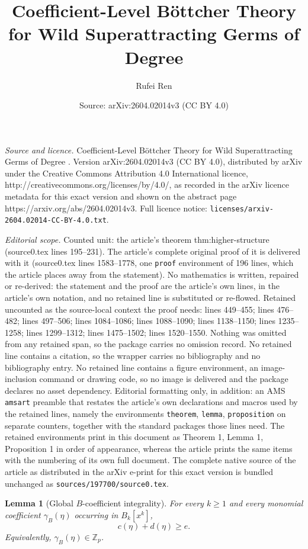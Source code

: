 \documentclass[10pt,a4paper]{amsart}
\title{Coefficient-Level B\"ottcher Theory for Wild Superattracting Germs of Degree \NoCaseChange{\texorpdfstring{$p^e$}{pe}}}
\author{Rufei Ren}
\date{Source: arXiv:2604.02014v3 (CC BY 4.0)}
\newtheorem{lemma}{Lemma}
\newcommand{\Zp}{\mathbb{Z}_p}
\begin{document}
\maketitle

\noindent\emph{Source and licence.} Coefficient-Level B\"ottcher Theory for Wild Superattracting Germs of Degree . Version arXiv:2604.02014v3 (CC BY 4.0), distributed by arXiv under the Creative Commons Attribution 4.0 International licence, http://creativecommons.org/licenses/by/4.0/, as recorded in the arXiv licence metadata for this exact version and shown on the abstract page https://arxiv.org/abs/2604.02014v3. Full licence notice: \texttt{licenses/arxiv-2604.02014-CC-BY-4.0.txt}.\par\smallskip

\noindent\textit{Editorial scope.} Counted unit: the article's theorem thm:higher-structure (source0.tex lines 195--231). The article's complete original proof of it is delivered with it (source0.tex lines 1583--1778, one \texttt{proof} environment of 196 lines, which the article places away from the statement). No mathematics is written, repaired or re-derived: the statement and the proof are the article's own lines, in the article's own notation, and no retained line is substituted or re-flowed.  Retained uncounted as the source-local context the proof needs: lines 449--455; lines 476--482; lines 497--506; lines 1084--1086; lines 1088--1090; lines 1138--1150; lines 1235--1258; lines 1299--1312; lines 1475--1502; lines 1520--1550.  Nothing was omitted from any retained span, so the package carries no omission record.  No retained line contains a citation, so the wrapper carries no bibliography and no bibliography entry.  No retained line contains a figure environment, an image-inclusion command or drawing code, so no image is delivered and the package declares no asset dependency.  Editorial formatting only, in addition: an AMS \texttt{amsart} preamble that restates the article's own declarations and macros used by the retained lines, namely the environments \texttt{theorem}, \texttt{lemma}, \texttt{proposition} on separate counters, together with the standard packages those lines need.  The retained environments print in this document as Theorem 1, Lemma 1, Proposition 1 in order of appearance, whereas the article prints the same items with the numbering of its own full document.  The complete native source of the article as distributed in the arXiv e-print for this exact version is bundled unchanged as \texttt{sources/197700/source0.tex}.
\begin{lemma}[Global $B$-coefficient integrality]\label{lem:B-integrality}
For every $k\ge1$ and every monomial coefficient $\gamma_B(\eta)$ occurring in $B_k[x^k]$,
\[
        c(\eta)+d(\eta)\ge e.
\]
Equivalently, $\gamma_B(\eta)\in\Zp$.
\end{lemma}
\end{document}
